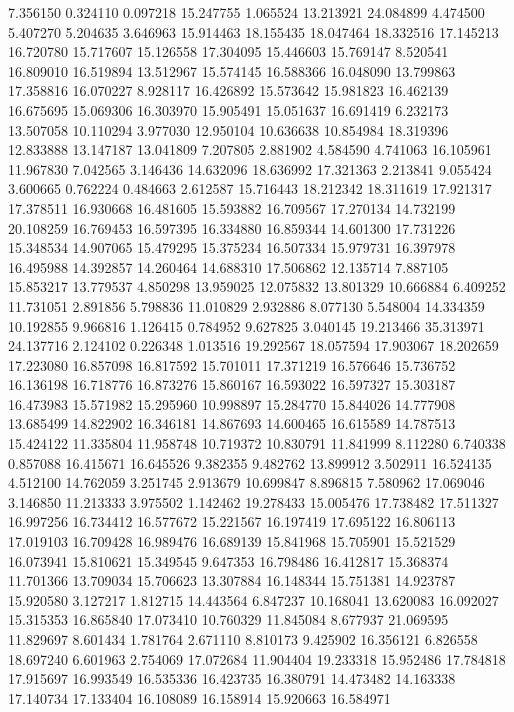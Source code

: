 7.356150
0.324110
0.097218
15.247755
1.065524
13.213921
24.084899
4.474500
5.407270
5.204635
3.646963
15.914463
18.155435
18.047464
18.332516
17.145213
16.720780
15.717607
15.126558
17.304095
15.446603
15.769147
8.520541
16.809010
16.519894
13.512967
15.574145
16.588366
16.048090
13.799863
17.358816
16.070227
8.928117
16.426892
15.573642
15.981823
16.462139
16.675695
15.069306
16.303970
15.905491
15.051637
16.691419
6.232173
13.507058
10.110294
3.977030
12.950104
10.636638
10.854984
18.319396
12.833888
13.147187
13.041809
7.207805
2.881902
4.584590
4.741063
16.105961
11.967830
7.042565
3.146436
14.632096
18.636992
17.321363
2.213841
9.055424
3.600665
0.762224
0.484663
2.612587
15.716443
18.212342
18.311619
17.921317
17.378511
16.930668
16.481605
15.593882
16.709567
17.270134
14.732199
20.108259
16.769453
16.597395
16.334880
16.859344
14.601300
17.731226
15.348534
14.907065
15.479295
15.375234
16.507334
15.979731
16.397978
16.495988
14.392857
14.260464
14.688310
17.506862
12.135714
7.887105
15.853217
13.779537
4.850298
13.959025
12.075832
13.801329
10.666884
6.409252
11.731051
2.891856
5.798836
11.010829
2.932886
8.077130
5.548004
14.334359
10.192855
9.966816
1.126415
0.784952
9.627825
3.040145
19.213466
35.313971
24.137716
2.124102
0.226348
1.013516
19.292567
18.057594
17.903067
18.202659
17.223080
16.857098
16.817592
15.701011
17.371219
16.576646
15.736752
16.136198
16.718776
16.873276
15.860167
16.593022
16.597327
15.303187
16.473983
15.571982
15.295960
10.998897
15.284770
15.844026
14.777908
13.685499
14.822902
16.346181
14.867693
14.600465
16.615589
14.787513
15.424122
11.335804
11.958748
10.719372
10.830791
11.841999
8.112280
6.740338
0.857088
16.415671
16.645526
9.382355
9.482762
13.899912
3.502911
16.524135
4.512100
14.762059
3.251745
2.913679
10.699847
8.896815
7.580962
17.069046
3.146850
11.213333
3.975502
1.142462
19.278433
15.005476
17.738482
17.511327
16.997256
16.734412
16.577672
15.221567
16.197419
17.695122
16.806113
17.019103
16.709428
16.989476
16.689139
15.841968
15.705901
15.521529
16.073941
15.810621
15.349545
9.647353
16.798486
16.412817
15.368374
11.701366
13.709034
15.706623
13.307884
16.148344
15.751381
14.923787
15.920580
3.127217
1.812715
14.443564
6.847237
10.168041
13.620083
16.092027
15.315353
16.865840
17.073410
10.760329
11.845084
8.677937
21.069595
11.829697
8.601434
1.781764
2.671110
8.810173
9.425902
16.356121
6.826558
18.697240
6.601963
2.754069
17.072684
11.904404
19.233318
15.952486
17.784818
17.915697
16.993549
16.535336
16.423735
16.380791
14.473482
14.163338
17.140734
17.133404
16.108089
16.158914
15.920663
16.584971
